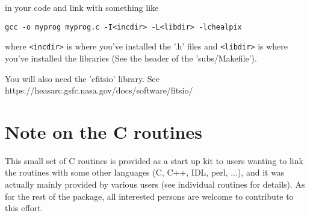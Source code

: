 \documentclass[12pt,twoside]{article}
\begin{document}
in your code and link with something like 
 
{\tt gcc -o myprog myprog.c -I<incdir> -L<libdir> -lchealpix}

where {\tt <incdir>} is where you've installed the '.h' files and 
{\tt <libdir>} is where you've installed the libraries (See the header of
the 'subs/Makefile').

You will also need the 'cfitsio' library. See \hfill \\
			{https://heasarc.gsfc.nasa.gov/docs/software/fitsio/}

\section[Note on the C routines]{{\Large Note on the C routines}}
This small set of C routines is provided as a start up kit to users wanting to
link the \healpix routines with some other languages (C, C++, IDL, perl, ...),
and it was actually mainly provided by various users (see individual routines
for details). As for the rest of the
\healpix package, all interested persons are welcome to contribute to this effort.

\newpage








\end{document}
